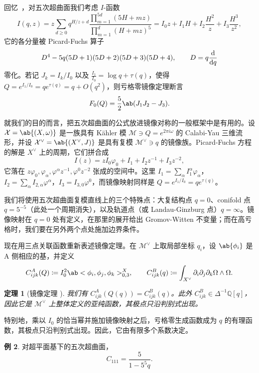 \documentclass{amsart}
\newtheorem{thm}{定理}[section]
\theoremstyle{definition}
\newtheorem{exm}[thm]{例}
\theoremstyle{remark}
\theoremstyle{plain}
\theoremstyle{definition}
\theoremstyle{remark}
\newcommand{\Q}{\mathbb{Q}}
\newcommand{\mc}[1]{\mathcal{#1}}
\newcommand{\1}{\mathbf{1}}
\newcommand{\2}{\mathbf{2}}
\newcommand{\3}{\mathbf{3}}
\begin{document}
回忆~，对五次超曲面我们考虑 \(I\)-函数
\[
    I(q,z) = z\sum_{d \geq 0} q^{H/z+d} \frac{\prod_{m=1}^{5d}(5H+mz)}{\prod_{m=1}^d (H+mz)^5} = I_0 z + I_1 H + I_2 \frac{H^2}{z} + I_3 \frac{H^3}{z^2},
\]
它的各分量被 Picard-Fuchs 算子
\[ D^4 - 5q(5D+1)(5D+2)(5D+3)(5D+4), \qquad D = q \odv{}{q} \]
零化。若记 \(J_k = I_k/I_0\) 以及 \(\frac{I_1}{I_0} = \log q + \tau(q)\)，使得 \(Q = e^{I_1/I_0} = qe^{\tau(q)} = q + O(q^2)\)，则亏格零镜像定理断言
\[ F_0(Q) = \frac{5}{2}\ab(J_1 J_2 - J_3). \]

就我们的目的而言，把五次超曲面的公式放进镜像对称的一般框架中是有用的。设 \(\mc{X} = \ab\{(X,\omega)\}\) 是一族具有 Kähler 模 \(\mc{M} \ni Q = e^{2\pi i \omega}\) 的 Calabi-Yau 三维流形，并设 \(\mc{X}^{\vee} = \ab\{(X^{\vee},J)\}\) 是具有复模 \(\mc{M}^{\vee} \ni q\) 的镜像族。Picard-Fuchs 方程的解是 \(X^{\vee}\) 上的周期，它们拼合成
\[ I(z) = zI_0\varphi_0 + I_1 + I_2 z^{-1} + I_3 z^{-2}, \]
它落在 \(z\varphi_0, \varphi_{\alpha}, \varphi^{\alpha}z^{-1}, \varphi^0 z^{-2}\) 张成的空间中。这里 \(I_1 = \sum_{\alpha} I_1^{\alpha}\varphi_{\alpha}\)，\(I_2 = \sum_{\alpha} I_{2,\alpha}\varphi^{\alpha}\)，\(I_3 = I_{3,0}\varphi^0\)，而镜像映射同样是 \(Q = e^{I_1/I_0} = qe^{\tau(q)}\)。

我们将使用五次超曲面复模直线上的三个特殊点：大复结构点 \(q=0\)、conifold 点 \(q = 5^{-5}\)（此处一个周期消失），以及轨道点（或 Landau-Ginzburg 点）\(q = \infty\)。镜像映射在 \(q=0\) 处有定义，在那里的展开给出 Gromov-Witten 不变量；而在高亏格时，我们要在另外两个点处施加边界条件。

现在用三点关联函数重新表述镜像定理。在 \(\mc{M}^{\vee}\) 上取局部坐标 \(q_i\)，设 \(\ab\{\phi_i\}\) 是 A 侧相应的基，并定义
\[ C^A_{ijk}(Q) \coloneqq I_0^2 \ab<\phi_i, \phi_j, \phi_k>^X_{0,3}, \qquad C^B_{ijk}(q) \coloneqq \int_{X^{\vee}} \partial_i \partial_j \partial_k \Omega \wedge \Omega. \]

\begin{thm}[镜像定理 {\cite{Givental1998,LLY1997}}]
    我们有 \(C^A_{ijk}(Q(q)) = C^B_{ijk}(q)\)。此外 \(C^B_{ijk} \in \Delta^{-1}\Q[q]\)，因此它是 \(\mc{M}^{\vee}\) 上整体定义的亚纯函数，其极点只沿判别式出现。
\end{thm}

特别地，乘以 \(I_0\) 的恰当幂并施加镜像映射之后，亏格零生成函数成为 \(q\) 的有理函数，其极点只沿判别式出现。因此，它由有限多个系数决定。

\begin{exm}
    对超平面基下的五次超曲面，
    \[ C_{111} = \frac{5}{1-5^5 q}. \]
\end{exm}
\end{document}
